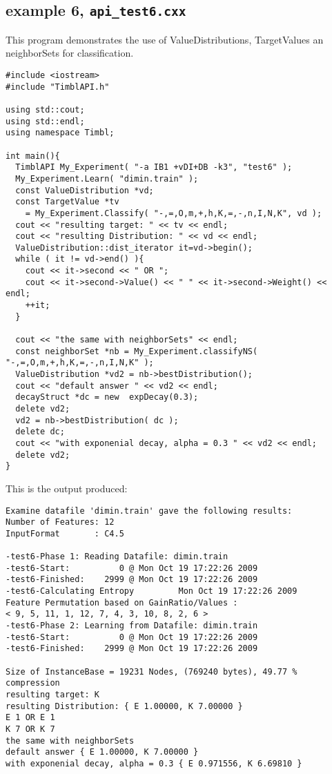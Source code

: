 \documentclass{report}
\begin{document}
\subsection{example 6, {\tt api\_test6.cxx}}

This program demonstrates the use of ValueDistributions, TargetValues
an neighborSets for classification.

\begin{footnotesize}
\begin{verbatim}
#include <iostream>
#include "TimblAPI.h"

using std::cout;
using std::endl;
using namespace Timbl;

int main(){
  TimblAPI My_Experiment( "-a IB1 +vDI+DB -k3", "test6" );
  My_Experiment.Learn( "dimin.train" ); 
  const ValueDistribution *vd;
  const TargetValue *tv
    = My_Experiment.Classify( "-,=,O,m,+,h,K,=,-,n,I,N,K", vd );
  cout << "resulting target: " << tv << endl;
  cout << "resulting Distribution: " << vd << endl;
  ValueDistribution::dist_iterator it=vd->begin();
  while ( it != vd->end() ){
    cout << it->second << " OR ";
    cout << it->second->Value() << " " << it->second->Weight() << endl;
    ++it;
  }

  cout << "the same with neighborSets" << endl;
  const neighborSet *nb = My_Experiment.classifyNS( "-,=,O,m,+,h,K,=,-,n,I,N,K" );
  ValueDistribution *vd2 = nb->bestDistribution();
  cout << "default answer " << vd2 << endl;
  decayStruct *dc = new  expDecay(0.3);
  delete vd2;
  vd2 = nb->bestDistribution( dc );
  delete dc;
  cout << "with exponenial decay, alpha = 0.3 " << vd2 << endl;  
  delete vd2;
}
\end{verbatim}
\end{footnotesize}

This is the output produced:

\begin{footnotesize}
\begin{verbatim}
Examine datafile 'dimin.train' gave the following results:
Number of Features: 12
InputFormat       : C4.5

-test6-Phase 1: Reading Datafile: dimin.train
-test6-Start:          0 @ Mon Oct 19 17:22:26 2009
-test6-Finished:    2999 @ Mon Oct 19 17:22:26 2009
-test6-Calculating Entropy         Mon Oct 19 17:22:26 2009
Feature Permutation based on GainRatio/Values :
< 9, 5, 11, 1, 12, 7, 4, 3, 10, 8, 2, 6 >
-test6-Phase 2: Learning from Datafile: dimin.train
-test6-Start:          0 @ Mon Oct 19 17:22:26 2009
-test6-Finished:    2999 @ Mon Oct 19 17:22:26 2009

Size of InstanceBase = 19231 Nodes, (769240 bytes), 49.77 % compression
resulting target: K
resulting Distribution: { E 1.00000, K 7.00000 }
E 1 OR E 1
K 7 OR K 7
the same with neighborSets
default answer { E 1.00000, K 7.00000 }
with exponenial decay, alpha = 0.3 { E 0.971556, K 6.69810 }
\end{verbatim}
\end{footnotesize}
\end{document}
